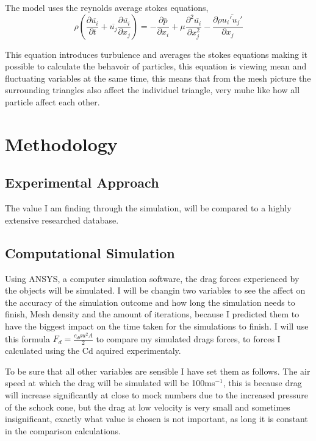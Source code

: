 \documentclass[12pt,a4paper]{article}
\begin{document}
The model uses the reynolds average stokes equations,
\begin{equation}
\rho\left(\frac{\partial \overline{u_i}}{\partial t} + \overline{u_j}\frac{\partial \overline{u_i}}{\partial x_j}\right) = -\frac{\partial \overline{p}}{\partial x_i} + \mu\frac{\partial^2 \overline{u_i}}{\partial x_j^2} - \frac{\partial \rho\overline{u_i' u_j'}}{\partial x_j}
\end{equation}

This equation introduces turbulence and averages the stokes equations making it possible to calculate the behavoir of particles,  this equation is viewing mean and fluctuating variables at the same time, this means that from the mesh picture the surrounding triangles also affect the individuel triangle, very muhc like how all particle affect each other.

\section{Methodology}

\subsection{Experimental Approach}

The value I am finding through the simulation, will be compared to a highly extensive researched database.

\subsection{Computational Simulation}

Using ANSYS, a computer simulation software, the drag forces experienced by the objects will be simulated. I will be changin two variables to see the affect on the accuracy of the simulation outcome and how long the simulation needs to finish, Mesh density and the amount of iterations, because I predicted them to have the biggest impact on the time taken for the simulations to finish. I will use this formula $F_d = \frac{c_d \rho u^2 A}{2}$ to compare my simulated drags forces, to forces I calculated using the Cd aquired experimentaly. 

To be sure that all other variables are sensible I have set them as follows. The air speed at which the drag will be simulated will be 100ms$^{-1}$, this is because drag will increase significantly at close to mock numbers due to the increased pressure of the schock cone, but the drag at low velocity is very small and sometimes insignificant, exactly what value is chosen is not important, as long it is constant in the comparison calculations. 
\end{document}

